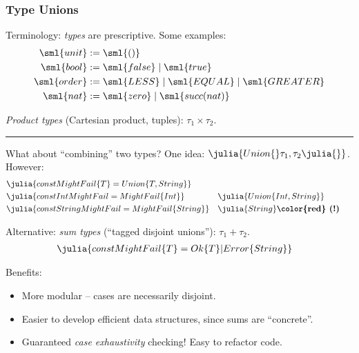 \documentclass[8pt]{beamer}
\newcommand{\yikes}{\textbf{\color{red} (!) }}
\begin{document}
\begin{frame}
  \frametitle{Type Unions}

  Terminology: \emph{types} are prescriptive. Some examples:
  \begin{align*}
    \sml{unit}  &:= \sml{()} \\
    \sml{bool}  &:= \sml{false} \mid \sml{true} \\
    \sml{order} &:= \sml{LESS} \mid \sml{EQUAL} \mid \sml{GREATER} \\
    \sml{nat}   &:= \sml{zero} \mid \sml{succ(nat)}
  \end{align*}

  \textit{Product types} (Cartesian product, tuples): $\tau_1 \times \tau_2$.

  \noindent\rule{\linewidth}{0.4pt}

  What about ``combining'' two types? One idea: $\julia{Union\{}\tau_1,\tau_2\julia{\}}$. However:
  \begin{align*}
    &\julia{const MightFail\{T\} = Union\{T,String\}} \\
    &\julia{const IntMightFail = MightFail\{Int\}} &&\julia{Union\{Int,String\}} \\
    &\julia{const StringMightFail = MightFail\{String\}} &&\julia{String} \yikes
  \end{align*}

  Alternative: \textit{sum types} (``tagged disjoint unions''): $\tau_1 + \tau_2$.
  \begin{align*}
    &\julia{const MightFail\{T\} = Ok\{T\} | Error\{String\}}
  \end{align*}

  Benefits:
  \begin{itemize}
    \item More modular -- cases are necessarily disjoint.
    \item Easier to develop efficient data structures, since sums are ``concrete''.
    \item Guaranteed \emph{case exhaustivity} checking! Easy to refactor code.
  \end{itemize}
\end{frame}
\end{document}
